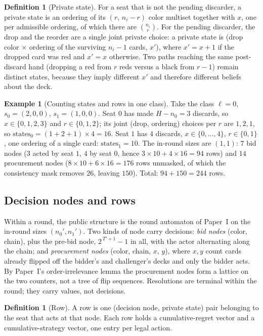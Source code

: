 \documentclass[11pt]{article}
\theoremstyle{plain}
\theoremstyle{definition}
\newtheorem{definition}[theorem]{Definition}
\newtheorem{example}[theorem]{Example}
\theoremstyle{remark}
\begin{document}
\begin{definition}[Private state]\label{def:privstate}
For a seat that is not the pending discarder, a private state is an
ordering of its $(r,\,n_i-r)$ color multiset together with $x$, one per
admissible ordering, of which there are $\binom{n_i}{r}$. For the
pending discarder, the drop and the reorder are a single joint private
choice: a private state is (drop color $\times$ ordering of the
surviving $n_i-1$ cards, $x'$), where $x'=x+1$ if the dropped card was
red and $x'=x$ otherwise. Two paths reaching the same post-discard hand
(dropping a red from $r$ reds versus a black from $r-1$) remain distinct
states, because they imply different $x'$ and therefore different
beliefs about the deck.
\end{definition}

\begin{example}[Counting states and rows in one class]\label{ex:rows}
Take the class $\ell=0$, $s_0=(2,0,0)$, $s_1=(1,0,0)$. Seat $0$ has
made $H-n_0=3$ discards, so $x\in\{0,1,2,3\}$ and $r\in\{0,1,2\}$; its
joint (drop, ordering) choices per $r$ are $1,2,1$, so
$\text{states}_0=(1+2+1)\times4=16$. Seat $1$ has $4$ discards,
$x\in\{0,\dots,4\}$, $r\in\{0,1\}$, one ordering of a single card:
$\text{states}_1=10$. The in-round sizes are $(1,1)$: $7$ bid nodes
($3$ acted by seat $1$, $4$ by seat $0$, hence
$3\times10+4\times16=94$ rows) and $14$ procurement nodes
($8\times10+6\times16=176$ rows unmasked, of which the consistency
mask removes $26$, leaving $150$). Total: $94+150=244$ rows.
\end{example}

\subsection{Decision nodes and rows}\label{sec:rows}

Within a round, the public structure is the round automaton of Paper~I on the
in-round sizes $(n_0',n_1')$. Two kinds of node carry decisions: \emph{bid
nodes} (color, chain), plus the pre-bid node, $2^{\,T'+1}-1$ in all, with the
actor alternating along the chain; and \emph{procurement nodes} (color, chain,
$x$, $y$), where $x,y$ count cards already flipped off the bidder's and
challenger's decks and only the bidder acts. By Paper~I's order-irrelevance
lemma the procurement nodes form a lattice on the two counters, not a tree of
flip sequences. Resolutions are terminal within the round; they carry values,
not decisions.

\begin{definition}[Row]\label{def:row}
A row is one (decision node, private state) pair belonging to the seat
that acts at that node. Each row holds a cumulative-regret vector and a
cumulative-strategy vector, one entry per legal action.
\end{definition}
\end{document}
